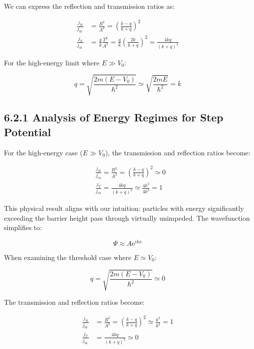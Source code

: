 \documentclass[italian]{HKNdocument}
\begin{document}
We can express the reflection and transmission ratios as:

\begin{align*}
\frac{j_{R}}{j_{\text {in }}} & =\frac{R^{2}}{A^{2}}=\left(\frac{k-q}{k+q}\right)^{2} \\
\frac{j_{T}}{j_{\text {in }}} & =\frac{q}{k} \frac{T^{2}}{A^{2}}=\frac{q}{k}\left(\frac{2 k}{k+q}\right)^{2}=\frac{4 k q}{(k+q)^{2}} \tag{6.28}
\end{align*}

For the high-energy limit where $E \gg V_{0}$:

\begin{equation*}
q=\sqrt{\frac{2 m\left(E-V_{0}\right)}{\hbar^{2}}} \simeq \sqrt{\frac{2 m E}{\hbar^{2}}}=k \tag{6.29}
\end{equation*}


\subsection*{6.2.1 Analysis of Energy Regimes for Step Potential}

For the high-energy case ($E \gg V_{0}$), the transmission and reflection ratios become:

\begin{align*}
& \frac{j_{R}}{j_{i n}}=\frac{R^{2}}{A^{2}}=\left(\frac{k-q}{k+q}\right)^{2} \simeq 0  \tag{6.30}\\
& \frac{j_{T}}{j_{i n}}=\frac{4 k q}{(k+q)^{2}} \simeq \frac{4 k^{2}}{4 k^{2}}=1
\end{align*}

This physical result aligns with our intuition: particles with energy significantly exceeding the barrier height pass through virtually unimpeded. The wavefunction simplifies to:

\begin{equation*}
\Psi \approx A \mathrm{e}^{i k x} \tag{6.31}
\end{equation*}

When examining the threshold case where $E \simeq V_{0}$:

\begin{equation*}
q=\sqrt{\frac{2 m\left(E-V_{0}\right)}{\hbar^{2}}} \simeq 0 \tag{6.32}
\end{equation*}

The transmission and reflection ratios become:

\begin{align*}
\frac{j_{R}}{j_{\text {in }}} & =\frac{R^{2}}{A^{2}}=\left(\frac{k-q}{k+q}\right)^{2} \simeq \frac{k^{2}}{k^{2}}=1  \tag{6.33}\\
\frac{j_{T}}{j_{\text {in }}} & =\frac{4 k q}{(k+q)^{2}} \simeq 0
\end{align*}
\end{document}
